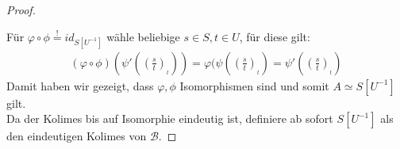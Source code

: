 \documentclass[10pt,a4paper]{report}
\newcommand{\lok}[2]{#1 [#2^{-1}]}
\newcommand{\loke}[3]{(\frac{#1}{#2})_{_{#3}}}
\newcommand*{\defshow}{\stackrel{!}{=}}
\begin{document}
\begin{proof}
\begin{center}
\end{center}
Für $\varphi \circ \phi \defshow id_{\lok{S}{U}}$ wähle beliebige $s \in S , t \in U$, für diese gilt:
\begin{gather*}
(\varphi \circ \phi)(\psi'(\loke{s}{t}{t})) =
 \varphi (\psi(\loke{s}{t}{t}) =
  \psi'(\loke{s}{t}{t})
\end{gather*}
Damit haben wir gezeigt, dass $\varphi,\phi$ Isomorphismen sind und somit $A \simeq \lok{S}{U}$ gilt.\\
Da der Kolimes bis auf Isomorphie eindeutig ist, definiere ab sofort $\lok{S}{U}$ als den eindeutigen Kolimes von $\mathcal{B}$.
 \end{proof}
\end{document}
